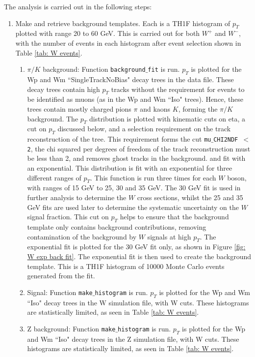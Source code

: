 \documentclass[a4paper]{article}
\begin{document}
The analysis is carried out in the following steps:
\begin{enumerate}
    \item Make and retrieve background templates. Each is a TH1F histogram of $p_T$ plotted with range 20 to 60 GeV. This is carried out for both $W^+$ and $W^-$, with the number of events in each histogram after event selection shown in Table \ref{tab: W events}.
    \begin{enumerate}
        \item $\pi/K$ background: Function \texttt{background$\_$fit} is run. $p_T$ is plotted for the Wp and Wm ``SingleTrackNoBias" decay trees in the data file. These decay trees contain high $p_T$ tracks without the requirement for events to be identified as muons (as in the Wp and Wm ``Iso" trees). Hence, these trees contain mostly charged pions $\pi$ and kaons $K$, forming the $\pi/K$ background.
The $p_T$ distribution is plotted with kinematic cuts on eta, a cut on $p_T$ discussed below, and a selection requirement on the track reconstruction of the tree. This requirement forms the cut \texttt{mu$\_$CHI2NDF $<$ 2}, the chi squared per degrees of freedom of the track reconstruction must be less than 2, and removes ghost tracks in the background. and fit with an exponential.
          \newline This distribution is fit with an exponential for three different ranges of $p_T$. This function is run three times for each $W$ boson, with ranges of 15 GeV to 25, 30 and 35 GeV. The 30 GeV fit is used in further analysis to determine the $W$ cross sections, whilst the 25 and 35 GeV fits are used later to determine the systematic uncertainty on the $W$ signal fraction. This cut on $p_T$ helps to ensure that the background template only contains background contributions, removing contamination of the background by $W$ signals at high $p_T$.
The exponential fit is plotted for the 30 GeV fit only, as shown in Figure \ref{fig: W exp back fit}.
          \newline The exponential fit is then used to create the background template. This is a TH1F histogram of 10000 Monte Carlo events generated from the fit.
        \item Signal: Function \texttt{make$\_$histogram} is run. $p_T$ is plotted for the Wp and Wm ``Iso" decay trees in the W simulation file, with W cuts. These histograms are statistically limited, as seen in Table \ref{tab: W events}.
        \item Z background: Function \texttt{make$\_$histogram} is run. $p_T$ is plotted for the Wp and Wm ``Iso" decay trees in the Z simulation file, with W cuts. These histograms are statistically limited, as seen in Table \ref{tab: W events}.
    \end{enumerate}
    

\end{enumerate}
\end{document}

